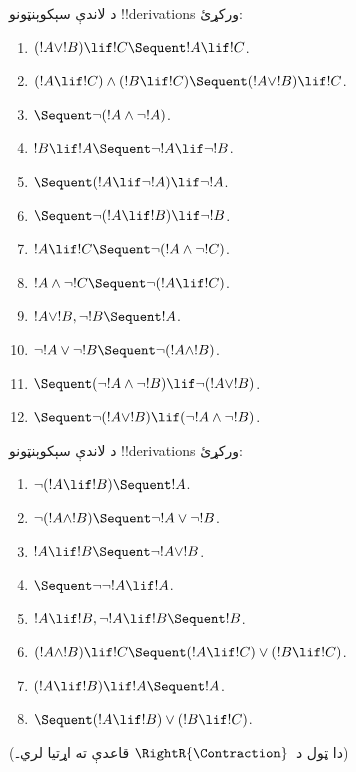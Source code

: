 \documentclass[../../../include/open-logic-section]{subfiles}
\begin{document}
\begin{prob}
د لاندې سېکوېنټونو !!{derivation}s ورکړئ:
\begin{enumerate}
\item $(!A \lor !B) \lif !C \Sequent !A \lif !C$.
\item $(!A \lif !C) \land (!B \lif !C) \Sequent (!A \lor !B) \lif !C$.
\item $\Sequent \lnot(!A \land \lnot !A)$.
\item $!B \lif !A \Sequent \lnot !A \lif \lnot !B$.
\item $\Sequent (!A \lif \lnot !A) \lif \lnot !A$.
\item $\Sequent \lnot(!A \lif !B) \lif \lnot !B$.
\item $!A \lif !C \Sequent \lnot (!A \land \lnot !C)$.
\item $!A \land \lnot !C \Sequent \lnot (!A \lif !C)$.
\item $!A \lor !B, \lnot !B \Sequent !A$.
\item $\lnot !A \lor \lnot !B \Sequent \lnot(!A \land !B)$.
\item $\Sequent (\lnot !A \land \lnot !B) \lif\lnot(!A \lor !B)$.
\item $\Sequent \lnot(!A \lor !B) \lif (\lnot !A \land \lnot !B)$.
\end{enumerate}
\end{prob}

\begin{prob}
د لاندې سېکوېنټونو !!{derivation}s ورکړئ:
\begin{enumerate}
\item $\lnot(!A \lif !B) \Sequent !A$.
\item $\lnot(!A \land !B) \Sequent \lnot !A \lor \lnot !B$.
\item $!A \lif !B \Sequent \lnot !A \lor !B$.
\item $\Sequent \lnot \lnot !A \lif !A$.
\item $!A \lif !B, \lnot !A \lif !B \Sequent !B$.
\item $(!A \land !B) \lif !C \Sequent (!A \lif !C) \lor (!B \lif !C)$.
\item $(!A \lif !B) \lif !A \Sequent !A$.
\item $\Sequent (!A \lif !B) \lor (!B \lif !C)$.
\end{enumerate}
(دا ټول د~$\RightR{\Contraction}$ قاعدې ته اړتيا لري۔)
\end{prob}
\end{document}
